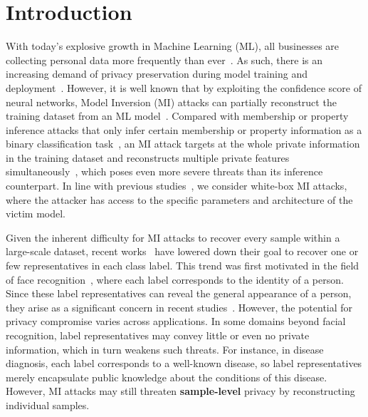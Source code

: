 \section{Introduction}
With today's explosive growth in Machine Learning (ML), all businesses are collecting personal data more frequently than ever~\cite{astaple3}.
As such, there is an increasing demand of privacy preservation during model training and deployment~\cite{astaple1, astaple2, astaple4, astaple5}.
However, it is well known that by exploiting the confidence score of neural networks, Model Inversion (MI) attacks can partially reconstruct the training dataset from an ML model~\cite{mi15}.
Compared with membership or property inference attacks that only infer certain membership or property information as a binary classification task~\cite{mif22sp}, an MI attack targets at the whole private information in the training dataset and reconstructs multiple private features simultaneously~\cite{misurvey22}, which poses even more severe threats than its inference counterpart.
In line with previous studies~\cite{gmi20cvpr, kedmi21iccv, ppa22icml}, we consider white-box MI attacks, where the attacker has access to the specific parameters and architecture of the victim model.

Given the inherent difficulty for MI attacks to recover every sample within a large-scale dataset, recent works~\cite{ppa22icml,mirror22ndss} have lowered down their goal to recover one or few representatives in each class label. This trend was first motivated in the field of face recognition~\cite{faceevolve21}, where each label corresponds to the identity of a person. Since these label representatives can reveal the general appearance of a person, they arise as a significant concern in recent studies~\cite{vmi21nips,rethink23cvpr}. However, the potential for privacy compromise varies across applications. In some domains beyond facial recognition, label representatives may convey little or even no private information, which in turn weakens such threats. For instance, in disease diagnosis, each label corresponds to a well-known disease, so label representatives merely encapsulate public knowledge about the conditions of this disease. However, MI attacks may still threaten {\bf sample-level} privacy by reconstructing individual samples.

